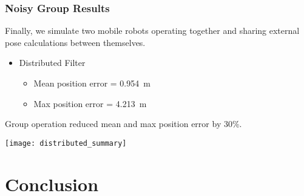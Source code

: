 \documentclass[14pt]{beamer}
\begin{document}
\begin{frame}
\frametitle{Noisy Group Results}
Finally, we simulate two mobile robots operating together and sharing external pose calculations between themselves.

\vspace{14pt}
\begin{itemize}
\item Distributed Filter
    \begin{itemize}
    \item Mean position error = \SI{.954}{\meter}
    \item Max position error = \SI{4.213}{\meter}
    \end{itemize}
\end{itemize}

\vspace{14pt}
Group operation reduced mean and max position error by 30\%.
\end{frame}

\begin{frame} %
\texttt{[image: distributed\_summary]}
\end{frame}

\section{Conclusion}
\end{document}
